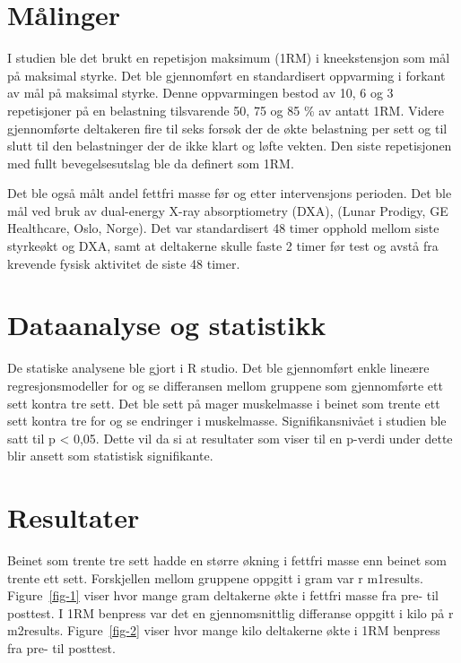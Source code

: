 \documentclass[
  letterpaper,
  DIV=11,
  numbers=noendperiod]{scrreprt}
\begin{document}
\section{Målinger}\label{muxe5linger}

I studien ble det brukt en repetisjon maksimum (1RM) i kneekstensjon som
mål på maksimal styrke. Det ble gjennomført en standardisert oppvarming
i forkant av mål på maksimal styrke. Denne oppvarmingen bestod av 10, 6
og 3 repetisjoner på en belastning tilsvarende 50, 75 og 85 \% av antatt
1RM. Videre gjennomførte deltakeren fire til seks forsøk der de økte
belastning per sett og til slutt til den belastninger der de ikke klart
og løfte vekten. Den siste repetisjonen med fullt bevegelsesutslag ble
da definert som 1RM.

Det ble også målt andel fettfri masse før og etter intervensjons
perioden. Det ble mål ved bruk av dual-energy X-ray absorptiometry
(DXA), (Lunar Prodigy, GE Healthcare, Oslo, Norge). Det var
standardisert 48 timer opphold mellom siste styrkeøkt og DXA, samt at
deltakerne skulle faste 2 timer før test og avstå fra krevende fysisk
aktivitet de siste 48 timer.

\section{Dataanalyse og statistikk}\label{dataanalyse-og-statistikk}

De statiske analysene ble gjort i R studio. Det ble gjennomført enkle
lineære regresjonsmodeller for og se differansen mellom gruppene som
gjennomførte ett sett kontra tre sett. Det ble sett på mager muskelmasse
i beinet som trente ett sett kontra tre for og se endringer i
muskelmasse. Signifikansnivået i studien ble satt til p \textless{}
0,05. Dette vil da si at resultater som viser til en p-verdi under dette
blir ansett som statistisk signifikante.

\section{Resultater}\label{resultater}

Beinet som trente tre sett hadde en større økning i fettfri masse enn
beinet som trente ett sett. Forskjellen mellom gruppene oppgitt i gram
var r m1results. Figure~\ref{fig-1} viser hvor mange gram deltakerne
økte i fettfri masse fra pre- til posttest. I 1RM benpress var det en
gjennomsnittlig differanse oppgitt i kilo på r m2results.
Figure~\ref{fig-2} viser hvor mange kilo deltakerne økte i 1RM benpress
fra pre- til posttest.
\end{document}
